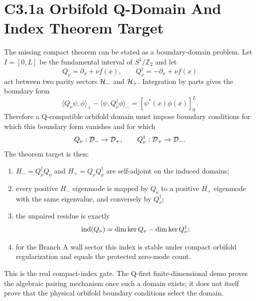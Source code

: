 \documentclass[11pt]{article}
\begin{document}
\section{C3.1a Orbifold Q-Domain And Index Theorem Target}
The missing compact theorem can be stated as a boundary-domain problem.  Let
$I=[0,L]$ be the fundamental interval of $S^1/\mathbb Z_2$ and let
\begin{equation}
Q_\nu=\partial_x+\nu f(x),\qquad Q_\nu^\dagger=-\partial_x+\nu f(x)
\end{equation}
act between two parity sectors ${\cal H}_-$ and ${\cal H}_+$.  Integration
by parts gives the boundary form
\begin{equation}
\langle Q_\nu\psi,\phi\rangle_{+}
-
\langle \psi,Q_\nu^\dagger\phi\rangle_{-}
=
\left[\psi^*(x)\phi(x)\right]_0^L .
\end{equation}
Therefore a Q-compatible orbifold domain must impose boundary conditions for
which this boundary form vanishes and for which
\begin{equation}
Q_\nu:{\cal D}_-\to{\cal D}_+,\qquad
Q_\nu^\dagger:{\cal D}_+\to{\cal D}_- .
\end{equation}
The theorem target is then:
\begin{enumerate}
\item $H_-=Q_\nu^\dagger Q_\nu$ and $H_+=Q_\nu Q_\nu^\dagger$ are self-adjoint
on the induced domains;
\item every positive $H_-$ eigenmode is mapped by $Q_\nu$ to a positive $H_+$
eigenmode with the same eigenvalue, and conversely by $Q_\nu^\dagger$;
\item the unpaired residue is exactly
\begin{equation}
{\rm ind}(Q_\nu)=\dim\ker Q_\nu-\dim\ker Q_\nu^\dagger;
\end{equation}
\item for the Branch A wall sector this index is stable under compact
orbifold regularization and equals the protected zero-mode count.
\end{enumerate}
This is the real compact-index gate.  The Q-first finite-dimensional demo
proves the algebraic pairing mechanism once such a domain exists; it does not
itself prove that the physical orbifold boundary conditions select the domain.
\end{document}
